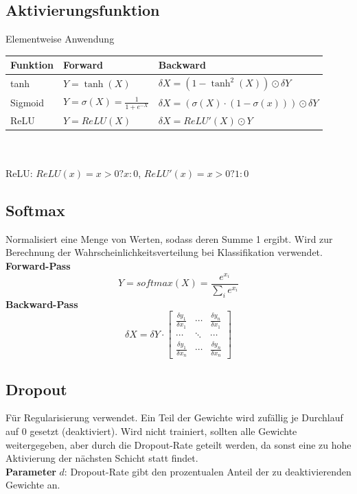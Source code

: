 \documentclass[12pt]{article}
\begin{document}
	\subsection{Aktivierungsfunktion}
	Elementweise Anwendung\\
	\begin{tabular}{|l|l|l|}
	\hline
	\textbf{Funktion} & \textbf{Forward} & \textbf{Backward}\\
	\hline
	tanh & $Y = \tanh(X)$ & $\delta X = (1 - \tanh^2(X)) \odot \delta Y$\\
	\hline
	Sigmoid & $Y = \sigma(X) = \frac{1}{1 + e^{-X}}$ & $\delta X = (\sigma(X) \cdot (1-\sigma(x))) \odot \delta Y$\\
	\hline
	ReLU & $Y = ReLU(X)$ & $\delta X = ReLU'(X) \odot Y$\\
	\hline
	\end{tabular}\\
	\\
	ReLU: $ReLU(x) = x > 0 ? x : 0$, $ReLU'(x) = x > 0 ? 1 : 0$
	\subsection{Softmax}
	Normalisiert eine Menge von Werten, sodass deren Summe 1 ergibt. Wird zur Berechnung der Wahrscheinlichkeitsverteilung bei Klassifikation verwendet.\\
	\textbf{Forward-Pass} $$Y = softmax(X) = \frac{e^{x_i}}{\sum_i e^{x_i}}$$
	\textbf{Backward-Pass} $$\delta X = \delta Y \cdot
	\begin{bmatrix}
	\frac{\delta y_1}{\delta x_1} & \cdots & \frac{\delta y_n}{\delta x_1}\\
	\cdots & \ddots & \cdots\\
	\frac{\delta y_1}{\delta x_n} & \cdots & \frac{\delta y_n}{\delta x_n}
	\end{bmatrix}
	$$
	\subsection{Dropout}
	Für Regularisierung verwendet. Ein Teil der Gewichte wird zufällig je Durchlauf auf 0 gesetzt (deaktiviert). Wird nicht trainiert, sollten alle Gewichte weitergegeben, aber durch die Dropout-Rate geteilt werden, da sonst eine zu hohe Aktivierung der nächsten Schicht statt findet.\\
	\textbf{Parameter} $d$: Dropout-Rate gibt den prozentualen Anteil der zu deaktivierenden Gewichte an.
\end{document}
